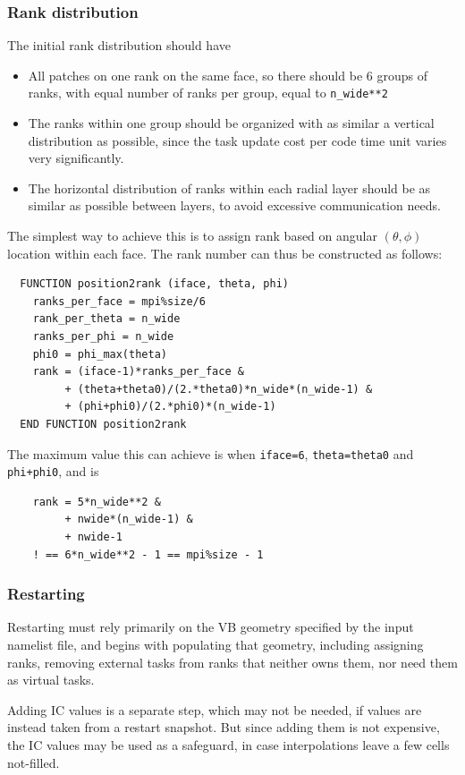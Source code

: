 \documentclass[paper=a4,fontsize=11pt]{scrartcl}
\numberwithin{equation}{section}		%
\numberwithin{figure}{section}			%
\numberwithin{table}{section}				%
\newcommand{\codecolor}{\color{Blue}}
\newcommand{\Code}[1]{{\codecolor\texttt{#1}}}
\begin{document}
\subsubsection{Rank distribution}
The initial rank distribution should have
\begin{itemize}
    \item All patches on one rank on the same face, so there should be 6 groups of ranks, with equal number of ranks per group, equal to \Code{n\_wide**2}
    \item The ranks within one group should be organized with as similar a vertical distribution as possible, since the task update cost per code time unit varies very significantly.
    \item The horizontal distribution of ranks within each radial layer should be as similar as possible between layers, to avoid excessive communication needs.
\end{itemize}
The simplest way to achieve this is to assign rank based on angular $(\theta,\phi)$ location within each face.  The rank number can thus be constructed as follows:
{\codecolor\small\begin{verbatim}
  FUNCTION position2rank (iface, theta, phi)
    ranks_per_face = mpi%size/6
    rank_per_theta = n_wide
    ranks_per_phi = n_wide
    phi0 = phi_max(theta)
    rank = (iface-1)*ranks_per_face &
         + (theta+theta0)/(2.*theta0)*n_wide*(n_wide-1) &
         + (phi+phi0)/(2.*phi0)*(n_wide-1)
  END FUNCTION position2rank
\end{verbatim}}
The maximum value this can achieve is when \Code{iface=6}, \Code{theta=theta0} and \Code{phi+phi0}, and is 
{\codecolor\small\begin{verbatim}
    rank = 5*n_wide**2 &
         + nwide*(n_wide-1) &
         + nwide-1
    ! == 6*n_wide**2 - 1 == mpi%size - 1
\end{verbatim}}

\subsubsection{Restarting}
Restarting must rely primarily on the VB geometry specified by the input namelist file, and begins with populating that geometry, including assigning ranks, removing external tasks from ranks that neither owns them, nor need them as virtual tasks.

Adding IC values is a separate step, which may not be needed, if values are instead taken from a restart snapshot.  But since adding them is not expensive, the IC values may be used as a safeguard, in case interpolations leave a few cells not-filled.
\end{document}
